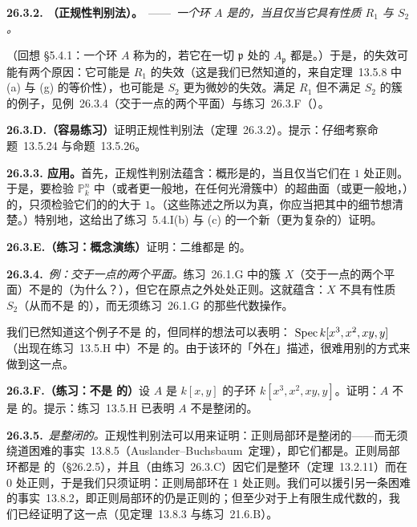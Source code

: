 \textbf{26.3.2. \trhTheorem{}（\trSerre{}正规性判别法）。}\ ——\ \emph{一个\trNoether{}环 $A$ 是\trNormal{}的，当且仅当它具有性质 $R_1$ 与 $S_2$。}

（回想 \S5.4.1：一个\trNoether{}环 $A$ 称为\trNormal{}的，若它在一切\trPrimeIdeal{} $\mathfrak{p}$ 处的\trLocalization{} $A_{\mathfrak{p}}$ 都是\trIntegrallyClosed\trIntegralDomain。）于是，\trNormality{}的失效可能有两个原因：它可能是 $R_1$ 的失效（这是我们已然知道的，来自\mbox{定理~13.5.8} 中 (a) 与 (g) 的等价性），也可能是 $S_2$ 更为微妙的失效。满足 $R_1$ 但不满足 $S_2$ 的簇的例子，见\mbox{例~26.3.4}（交于一点的两个平面）与\mbox{练习~26.3.F}（\trPinchedPlane）。

\textbf{26.3.D.（容易练习）}\quad 证明\trSerre{}正规性判别法（\mbox{定理~26.3.2}）。提示：仔细考察\mbox{命题~13.5.24} 与\mbox{命题~13.5.26}。

\textbf{26.3.3. 应用。}\quad 首先，\trSerre{}正规性判别法蕴含：\trCM{}概形是\trNormal{}的，当且仅当它们在\trCodimension{} $1$ 处正则。于是，要检验 $\mathbb{P}^n_k$ 中（或者更一般地，在任何光滑簇中）的超曲面（或更一般地，\trRegularEmbedding）的\trNormality，只须检验它们的\trSingularLocus{}的\trCodimension{}大于 $1$。（这些陈述之所以为真，你应当把其中的细节想清楚。）特别地，这给出了\mbox{练习~5.4.I}(b) 与 (c) 的一个新（更为复杂的）证明。

\textbf{26.3.E.（练习：概念演练）}\quad 证明：二维\trNormal\trVariety{}都是 \trCM{}的。

\textbf{26.3.4.}\ \emph{例：交于一点的两个平面。}\quad \mbox{练习~26.1.G} 中的簇 $X$（交于一点的两个平面）不是\trNormal{}的（为什么？），但它在原点之外处处正则。这就蕴含：$X$ 不具有性质 $S_2$（从而不是 \trCM{}的），而无须\mbox{练习~26.1.G} 的那些代数操作。

我们已然知道这个例子不是 \trCM{}的，但同样的想法可以表明：\trPinchedPlane{} $\operatorname{Spec} k[x^3,x^2,xy,y]$（出现在\mbox{练习~13.5.H} 中）不是 \trCM{}的。由于该环的「外在」描述，很难用别的方式来做到这一点。

\textbf{26.3.F.（练习：\trPinchedPlane{}不是 \trCM{}的）}\quad 设 $A$ 是 $k[x,y]$ 的子环 $k[x^3,x^2,xy,y]$。证明：$A$ 不是 \trCM{}的。提示：\mbox{练习~13.5.H} 已表明 $A$ 不是整闭的。

\textbf{26.3.5.}\ \emph{\trRegular\trLocalRing{}是整闭的。}\quad \trSerre{}正规性判别法可以用来证明：正则局部环是整闭的——而无须绕道困难的\mbox{事实~13.8.5}（\mbox{Auslander--Buchsbaum 定理}），即它们都是\trUFD。正则局部环都是 \trCM{}的（\S26.2.5），并且（由\mbox{练习~26.3.C}）因它们是整环（\mbox{定理~13.2.11}）而在\trCodimension{} $0$ 处正则，于是我们只须证明：正则局部环在\trCodimension{} $1$ 处正则。我们可以援引另一条困难的\mbox{事实~13.8.2}，即正则局部环的\trLocalization{}仍是正则的；但至少对于\trPerfectField{}上有限生成代数的\trLocalization，我们已经证明了这一点（见\mbox{定理~13.8.3} 与\mbox{练习~21.6.B}）。

